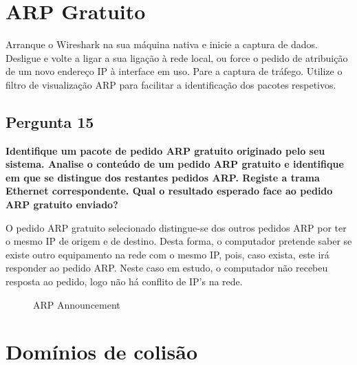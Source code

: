 \documentclass[11pt]{article}
\begin{document}

\clearpage
\section{ARP Gratuito}

Arranque o Wireshark na sua máquina nativa e inicie a captura de dados. Desligue e volte a ligar a sua ligação à rede local, ou force o pedido de atribuição de um novo endereço IP à interface em uso. Pare a captura de tráfego. Utilize o filtro de visualização ARP para facilitar a identificação dos pacotes respetivos.

\vspace{0.5cm}

\subsection{Pergunta 15}

\textbf{Identifique um pacote de pedido ARP gratuito originado pelo seu sistema. Analise o conteúdo de um pedido ARP gratuito e identifique em que se distingue dos restantes pedidos ARP. Registe a trama Ethernet correspondente. Qual o resultado esperado face ao pedido ARP gratuito enviado?}

O pedido ARP gratuito selecionado distingue-se dos outros pedidos ARP por ter o mesmo IP de origem e de destino. Desta forma, o computador pretende saber se existe outro equipamento na rede com o mesmo IP, pois, caso exista, este irá responder ao pedido ARP. Neste caso em estudo, o computador não recebeu resposta ao pedido, logo não há conflito de IP's na rede.

\begin{figure}[hbt!]
    \centering
    \caption{ARP Announcement}
\end{figure}





\clearpage
\section{Domínios de colisão}
\end{document}
